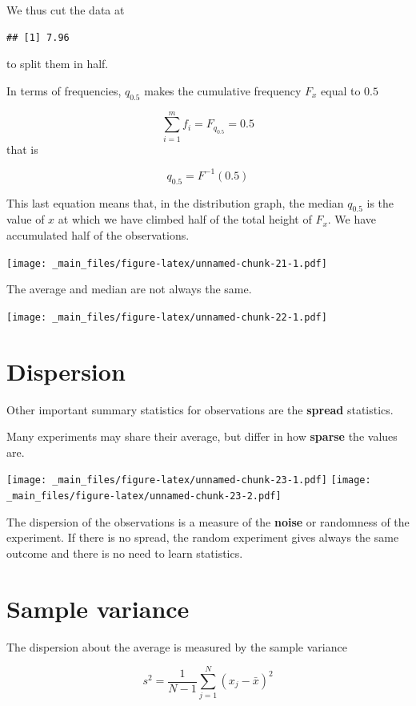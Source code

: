 \documentclass[
]{book}
\begin{document}
We thus cut the data at

\begin{verbatim}
## [1] 7.96
\end{verbatim}

to split them in half.

In terms of frequencies, \(q_{0.5}\) makes the cumulative frequency \(F_x\) equal to \(0.5\)

\[\sum_{i = 1}^m f_i =F_{q_{0.5}}=0.5\]
that is

\[q_{ 0.5}= F^{-1}(0.5)\]

This last equation means that, in the distribution graph, the median \(q_{ 0.5}\) is the value of \(x\) at which we have climbed half of the total height of \(F_x\). We have accumulated half of the observations.

\texttt{[image: \_main\_files/figure-latex/unnamed-chunk-21-1.pdf]}

The average and median are not always the same.

\texttt{[image: \_main\_files/figure-latex/unnamed-chunk-22-1.pdf]}

\hypertarget{dispersion}{%
\section{Dispersion}\label{dispersion}}

Other important summary statistics for observations are the \textbf{spread} statistics.

Many experiments may share their average, but differ in how \textbf{sparse} the values are.

\texttt{[image: \_main\_files/figure-latex/unnamed-chunk-23-1.pdf]} \texttt{[image: \_main\_files/figure-latex/unnamed-chunk-23-2.pdf]}

The dispersion of the observations is a measure of the \textbf{noise} or randomness of the experiment. If there is no spread, the random experiment gives always the same outcome and there is no need to learn statistics.

\hypertarget{sample-variance}{%
\section{Sample variance}\label{sample-variance}}

The dispersion about the average is measured by the sample variance

\[s^2=\frac{ 1}{ N-1} \sum_{j=1}^N ( x_j -\bar{x})^2\]
\end{document}

